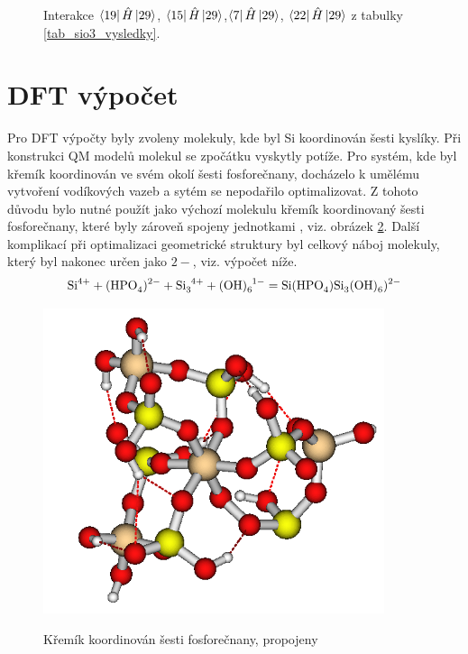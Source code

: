 \documentclass[
  digital, %
  table,   %
  lof,     %
  lot,     %
]{fithesis3}
\begin{document}
\begin{figure}
\begin{center}
{\label{obr_sio3_MO_35}}
\caption{Interakce $\bra{19}{\hat{H}}\ket{29}$, $\bra{15}{\hat{H}}\ket{29}$,$\bra{7}{\hat{H}}\ket{29}$, $\bra{22}{\hat{H}}\ket{29}$ z tabulky \ref{tab_sio3_vysledky}.}

\label{obr_sio3p_vysledky_I}\end{center}
\end{figure} 
  
\section{DFT výpočet} 
Pro DFT výpočty byly zvoleny molekuly, kde byl Si koordinován šesti kyslíky. Při konstrukci QM modelů molekul se zpočátku vyskytly potíže. Pro systém, kde byl křemík koordinován ve svém okolí šesti fosforečnany, docházelo k umělému vytvoření vodíkových vazeb a sytém se nepodařilo optimalizovat. Z tohoto důvodu bylo nutné použít jako výchozí molekulu křemík koordinovaný šesti fosforečnany, které byly zároveň spojeny jednotkami , viz. obrázek \ref{obr_si_o_poh3_6_propojeno_si}. Další komplikací při optimalizaci geometrické struktury byl celkový náboj molekuly, který byl nakonec určen jako $2-$, viz. výpočet níže. 
\begin{displaymath}
\ce{Si}^{4+} + \ce{(HPO4)^{2-}} + \ce{Si3^{4+}} + \ce{(OH)6^1-} = \ce{Si(HPO4)Si3(OH)6)^{2-}}
\end{displaymath}

\begin{figure}[h]
\caption{Křemík koordinován šesti fosforečnany, propojeny  }
  \center
  \includegraphics[width=10cm]{obr_si_o_poh3_6_propojeno_si.png}
  \label{obr_si_o_poh3_6_propojeno_si}
  \end{figure}
  
\end{document}
